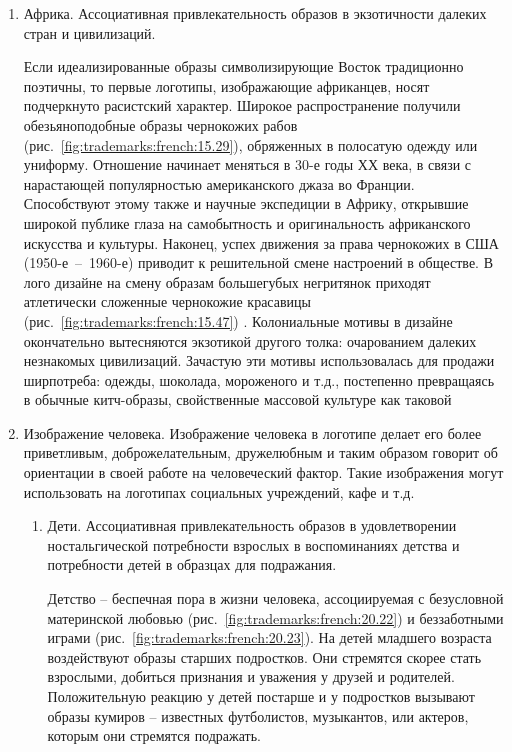 \begin{enumerate}
\begin{enumerate}
  \item Африка. Ассоциативная привлекательность образов в экзотичности далеких
    стран и цивилизаций.

    Если идеализированные образы символизирующие Восток традиционно поэтичны, то
    первые логотипы, изображающие африканцев, носят подчеркнуто расистский
    характер. Широкое распространение получили обезьяноподобные образы чернокожих
    рабов (рис.~\ref{fig:trademarks:french:15.29}), обряженных в полосатую одежду
    или униформу.  Отношение начинает меняться в 30-е годы ХХ века, в связи с
    нарастающей популярностью американского джаза во Франции. Способствуют этому
    также и научные экспедиции в Африку, открывшие широкой публике глаза на
    самобытность и оригинальность африканского искусства и культуры.  Наконец, успех
    движения за права чернокожих в США (1950-е~--~1960-е) приводит к решительной
    смене настроений в обществе. В лого дизайне на смену образам большегубых
    негритянок приходят атлетически сложенные чернокожие красавицы
    (рис.~\ref{fig:trademarks:french:15.47}) . Колониальные мотивы в дизайне
    окончательно вытесняются экзотикой другого толка: очарованием далеких незнакомых
    цивилизаций. Зачастую эти мотивы использовалась для продажи ширпотреба: одежды,
    шоколада, мороженого и т.д., постепенно превращаясь в обычные китч-образы,
    свойственные массовой культуре как таковой %

  \item Изображение человека. Изображение человека в логотипе делает его более
    приветливым, доброжелательным, дружелюбным и таким образом говорит об ориентации
    в своей работе на человеческий фактор. Такие изображения могут использовать на
    логотипах социальных учреждений, кафе и т.д.
    \begin{enumerate}
    \item Дети. Ассоциативная привлекательность образов в удовлетворении
      ностальгической потребности взрослых в воспоминаниях детства и потребности детей
      в образцах для подражания.

      Детство -- беспечная пора в жизни человека, ассоциируемая с безусловной
      материнской любовью (рис.~\ref{fig:trademarks:french:20.22}) и беззаботными
      играми (рис.~\ref{fig:trademarks:french:20.23}). На детей младшего возраста
      воздействуют образы старших подростков. Они стремятся скорее стать взрослыми,
      добиться признания и уважения у друзей и родителей. Положительную реакцию у
      детей постарше и у подростков вызывают образы кумиров -- известных футболистов,
      музыкантов, или актеров, которым они стремятся подражать.


\end{enumerate}
\end{enumerate}
\end{enumerate}
